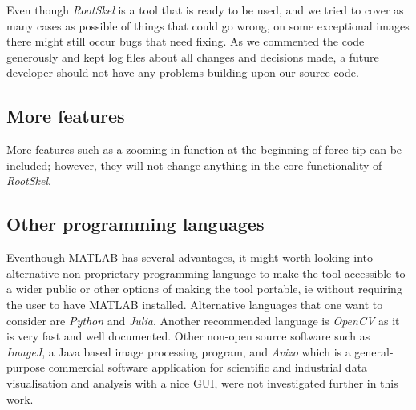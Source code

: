 Even though \textit{RootSkel} is a tool that is ready to be used, and we tried to cover as many cases as possible of things that could go wrong, on some exceptional images there might still occur bugs that need fixing.
As we commented the code generously and kept log files about all changes and decisions made, a future developer should not have any problems building upon our source code.



\subsection{More features}

More features such as a zooming in function at the beginning of force tip can be included; however, they will not change anything in the core functionality of \textit{RootSkel}.



\subsection{Other programming languages}

Eventhough MATLAB has several advantages, it might worth looking into alternative non-proprietary programming language to make the tool accessible to a wider public or other options of making the tool portable, ie without requiring the user to have MATLAB installed.
Alternative languages that one want to consider are \textit{Python} and \textit{Julia}. Another recommended language is \textit{OpenCV} as it is very fast and well documented. Other non-open source software such as \textit{ImageJ}, a Java based image processing program, and \textit{Avizo} which is a general-purpose commercial software application for scientific and industrial data visualisation and analysis with a nice GUI, were not investigated further in this work. 


